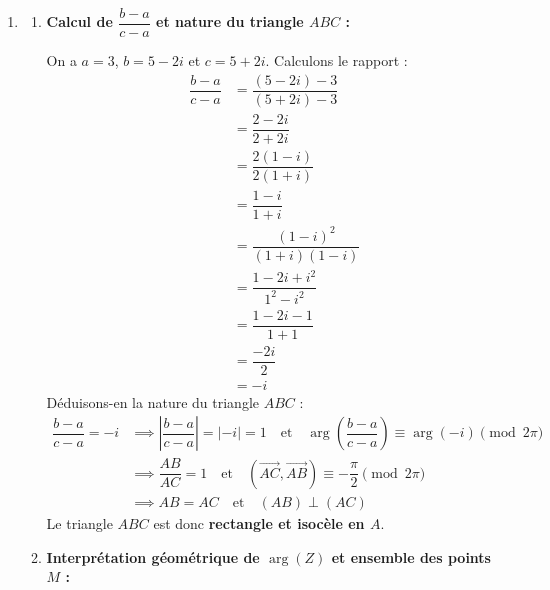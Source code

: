 \documentclass[12pt,a4paper]{article}
\begin{document}
\begin{enumerate}
    \item 
    \begin{enumerate}
        \item \textbf{Calcul de $\dfrac{b - a}{c - a}$ et nature du triangle $ABC$ :}
        
        On a $a = 3$, $b = 5 - 2i$ et $c = 5 + 2i$. Calculons le rapport :
        $$
        \begin{aligned}
            \dfrac{b - a}{c - a} &= \dfrac{(5 - 2i) - 3}{(5 + 2i) - 3} \\
            &= \dfrac{2 - 2i}{2 + 2i} \\
            &= \dfrac{2(1 - i)}{2(1 + i)} \\
            &= \dfrac{1 - i}{1 + i} \\
            &= \dfrac{(1 - i)^2}{(1 + i)(1 - i)} \\
            &= \dfrac{1 - 2i + i^2}{1^2 - i^2} \\
            &= \dfrac{1 - 2i - 1}{1 + 1} \\
            &= \dfrac{-2i}{2} \\
            &= -i
        \end{aligned}
        $$
        Déduisons-en la nature du triangle $ABC$ :
        $$
        \begin{aligned}
            \dfrac{b - a}{c - a} = -i &\implies \left| \dfrac{b - a}{c - a} \right| = |-i| = 1 \quad \text{et} \quad \arg\left(\dfrac{b - a}{c - a}\right) \equiv \arg(-i) \pmod{2\pi} \\
            &\implies \dfrac{AB}{AC} = 1 \quad \text{et} \quad \left(\overrightarrow{AC}, \overrightarrow{AB}\right) \equiv -\dfrac{\pi}{2} \pmod{2\pi} \\
            &\implies AB = AC \quad \text{et} \quad (AB) \perp (AC)
        \end{aligned}
        $$
        Le triangle $ABC$ est donc \textbf{rectangle et isocèle en $A$}.

        \item \textbf{Interprétation géométrique de $\arg(Z)$ et ensemble des points $M$ :}
        

\end{enumerate}
\end{enumerate}
\end{document}
